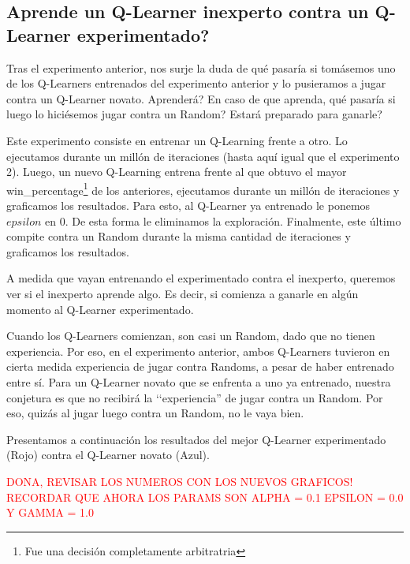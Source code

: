 \subsection{Aprende un Q-Learner inexperto contra un Q-Learner experimentado?}

Tras el experimento anterior, nos surje la duda de qué pasaría si tomásemos uno de los Q-Learners entrenados del experimento anterior y lo pusieramos a jugar contra un Q-Learner novato. Aprenderá? En caso de que aprenda, qué pasaría si luego lo hiciésemos jugar contra un Random? Estará preparado para ganarle?

Este experimento consiste en entrenar un Q-Learning frente a otro. Lo ejecutamos durante un mill\'on de iteraciones (hasta aqu\'i igual que el experimento 2). Luego, un nuevo Q-Learning entrena frente al que obtuvo el mayor win\_percentage\footnote{Fue una decisi\'on completamente arbitratria} de los anteriores, ejecutamos durante un mill\'on de iteraciones y graficamos los resultados. Para esto, al Q-Learner ya entrenado le ponemos $epsilon$ en 0. De esta forma le eliminamos la exploración. Finalmente, este \'ultimo compite contra un Random durante la misma cantidad de iteraciones y graficamos los resultados.

A medida que vayan entrenando el experimentado contra el inexperto, queremos ver si el inexperto aprende algo. Es decir, si comienza a ganarle en algún momento al Q-Learner experimentado.

Cuando los Q-Learners comienzan, son casi un Random, dado que no tienen experiencia. Por eso, en el experimento anterior, ambos Q-Learners tuvieron en cierta medida experiencia de jugar contra Randoms, a pesar de haber entrenado entre sí. Para un Q-Learner novato que se enfrenta a uno ya entrenado, nuestra conjetura es que no recibirá la ‘‘experiencia'' de jugar contra un Random. Por eso, quizás al jugar luego contra un Random, no le vaya bien.

Presentamos a continuación los resultados del mejor Q-Learner experimentado (Rojo) contra el Q-Learner novato (Azul).



\textcolor{red}{DONA, REVISAR LOS NUMEROS CON LOS NUEVOS GRAFICOS! RECORDAR QUE AHORA LOS PARAMS SON ALPHA = 0.1 EPSILON = 0.0 Y GAMMA = 1.0}

